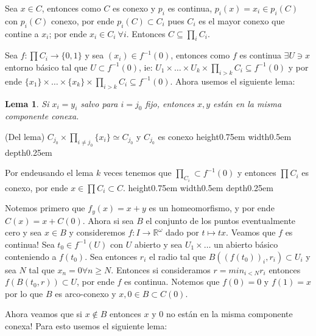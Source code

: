 \documentclass[11pt]{article}
\newcommand{\R}{{\mathbb{R}}}
\newcommand{\sett}[1]{\{#1\}}
\newtheorem{lemma}[theorem]{Lema}
\newenvironment{proof}[1][Demostraci\'on]{\begin{trivlist}
\item[\hskip \labelsep {\bfseries #1}]}{\end{trivlist}}
\newcommand{\qed}{\nobreak \ifvmode \relax \else
      \ifdim\lastskip<1.5em \hskip-\lastskip
      \hskip1.5em plus0em minus0.5em \fi \nobreak
      \vrule height0.75em width0.5em depth0.25em\fi}
\begin{document}
\begin{proof}
 
\begin{enumerate}

\item Sea $x \in C$, entonces como $C$ es conexo y $p_i$ es continua, $p_i(x) = x_i \in p_i(C)$ con $p_i(C)$ conexo, por ende $p_i(C) \subset C_i$ pues $C_i$ es el mayor conexo que contine a $x_i$; por ende $x_i \in C_i \ \forall i$. Entonces $C \subseteq \prod_{i}{C_i}$.

Sea $f : \prod {C_i} \rightarrow \sett{0,1}$ y sea $(x_i) \in f^{-1}(0)$, entonces como $f$ es continua $\exists U \ni x$ entorno b\'asico tal que $U \subset f^{-1}(0)$, ie: $U_1 \times \dots \times U_k \times \prod_{i > k}{C_i} \subseteq f^{-1}(0)$ y por ende $\sett{x_1} \times \dots \times \sett{x_k} \times \prod_{i>k}{C_i} \subseteq f^{-1}(0)$. Ahora usemos el siguiente lema:

\begin{lemma}

Si $x_i =  y_i$ salvo para $i= j_0$ fijo, entonces $x,y$ est\'an en la misma componente conexa.

\end{lemma}

\begin{proof} (Del lema)
$C_{j_0} \times \prod_{i \neq j_0}{\sett{x_i}} \simeq C_{j_0}$ y $C_{j_0}$ es conexo \qed
\end{proof}

Por endeusando el lema $k$ veces tenemos que $\prod_{C_i} \subset f^{-1}(0)$ y entonces $\prod {C_i}$ es conexo, por ende $x \in \prod {C_i} \subset C$. \qed


\item Notemos primero que $f_y (x) = x+y$ es un homeomorfismo, y por ende $C(x) = x + C(0)$. Ahora si sea $B$ el conjunto de los puntos eventualmente cero y sea $x \in B$ y consideremos $f : I \rightarrow \R^{\omega}$ dado por $t \mapsto tx$. Veamos que $f$ es continua! Sea $t_0 \in f^{-1}(U)$ con $U$ abierto y sea $U_1 \times \dots $ un abierto b\'asico conteniendo a $f(t_0)$. Sea entonces $r_i$ el radio tal que $B((f(t_0))_i,r_i) \subset U_i$ y sea $N$ tal que $x_n = 0 \forall n \geq N$. Entonces si consideramos $r = min_{i<N}{r_i}$ entonces $f(B(t_0,r)) \subset U$, por ende $f$ es continua. Notemos que $f(0) = 0$ y $f(1) = x$ por lo que $B$ es arco-conexo y $x,0 \in B \subset C(0)$.

Ahora veamos que si $x \not \in B$ entonces $x$ y $0$ no est\'an en la misma componente conexa! Para esto usemos el siguiente lema:


\end{enumerate}
\end{proof}
\end{document}
